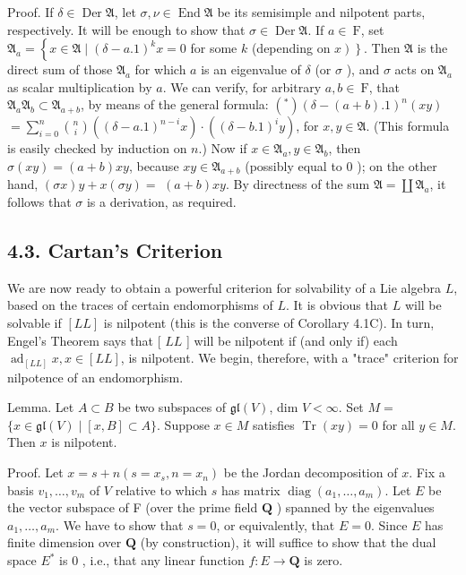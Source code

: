 \documentclass[10pt]{article}
\begin{document}
Proof. If $\delta \in \operatorname{Der} \mathfrak{A}$, let $\sigma, \nu \in \operatorname{End} \mathfrak{A}$ be its semisimple and nilpotent parts, respectively. It will be enough to show that $\sigma \in \operatorname{Der} \mathfrak{A}$. If $a \in \mathrm{~F}$, set $\mathfrak{A}_{a}=\left\{x \in \mathfrak{A} \mid(\delta-a .1)^{k} x=0\right.$ for some $k$ (depending on $\left.\left.x\right)\right\}$. Then $\mathfrak{A}$ is the direct sum of those $\mathfrak{A}_{a}$ for which $a$ is an eigenvalue of $\delta$ (or $\sigma$ ), and $\sigma$ acts on $\mathfrak{A}_{a}$ as scalar multiplication by $a$. We can verify, for arbitrary $a, b \in \mathrm{~F}$, that $\mathfrak{A}_{a} \mathfrak{A}_{b} \subset \mathfrak{A}_{a+b}$, by means of the general formula: $\left(^{*}\right)(\delta-(a+b) .1)^{n}(x y)$\\
$=\sum_{i=0}^{n}\binom{n}{i}\left((\delta-a .1)^{n-i} x\right) \cdot\left((\delta-b .1)^{i} y\right)$, for $x, y \in \mathfrak{A}$. (This formula is easily checked by induction on $n$.) Now if $x \in \mathfrak{A}_{a}, y \in \mathfrak{A}_{b}$, then $\sigma(x y)=(a+b) x y$, because $x y \in \mathfrak{A}_{a+b}$ (possibly equal to 0 ); on the other hand, $(\sigma x) y+x(\sigma y)=$ $(a+b) x y$. By directness of the sum $\mathfrak{A}=\coprod \mathfrak{A}_{a}$, it follows that $\sigma$ is a derivation, as required.

\subsection*{4.3. Cartan's Criterion}
We are now ready to obtain a powerful criterion for solvability of a Lie algebra $L$, based on the traces of certain endomorphisms of $L$. It is obvious that $L$ will be solvable if $[L L]$ is nilpotent (this is the converse of Corollary 4.1C). In turn, Engel's Theorem says that [ $L L$ ] will be nilpotent if (and only if) each $\operatorname{ad}_{[L L]} x, x \in[L L]$, is nilpotent. We begin, therefore, with a "trace" criterion for nilpotence of an endomorphism.

Lemma. Let $A \subset B$ be two subspaces of $\mathfrak{g l}(V)$, dim $V<\infty$. Set $M=$ $\{x \in \mathfrak{g l}(V) \mid[x, B] \subset A\}$. Suppose $x \in M$ satisfies $\operatorname{Tr}(x y)=0$ for all $y \in M$. Then $x$ is nilpotent.

Proof. Let $x=s+n\left(s=x_{s}, n=x_{n}\right)$ be the Jordan decomposition of $x$. Fix a basis $v_{1}, \ldots, v_{m}$ of $V$ relative to which $s$ has matrix $\operatorname{diag}\left(a_{1}, \ldots, a_{m}\right)$. Let $E$ be the vector subspace of F (over the prime field $\mathbf{Q}$ ) spanned by the eigenvalues $a_{1}, \ldots, a_{m}$. We have to show that $s=0$, or equivalently, that $E=0$. Since $E$ has finite dimension over $\mathbf{Q}$ (by construction), it will suffice to show that the dual space $E^{*}$ is 0 , i.e., that any linear function $f: E \rightarrow \mathbf{Q}$ is zero.
\end{document}
